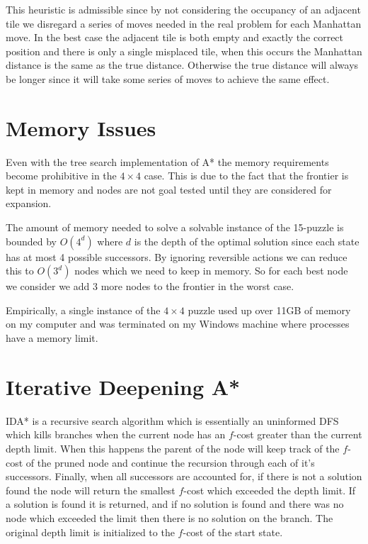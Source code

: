\documentclass[11pt, oneside]{article}   	%
\begin{document}
This heuristic is admissible since by not considering the occupancy of an adjacent tile we disregard a series of moves needed in the real problem for each Manhattan move.  In the best case the adjacent tile is both empty and exactly the correct position and there is only a single misplaced tile, when this occurs the Manhattan distance is the same as the true distance.  Otherwise the true distance will always be longer since it will take some series of moves to achieve the same effect.

\pagebreak{}

\section{Memory Issues}

Even with the tree search implementation of A* the memory requirements become prohibitive in the $4 \times 4$ case.  This is due to the fact that the frontier is kept in memory and nodes are not goal tested until they are considered for expansion.

The amount of memory needed to solve a solvable instance of the 15-puzzle is bounded by $O(4^d)$ where $d$ is the depth of the optimal solution since each state has at most 4 possible successors.  By ignoring reversible actions we can reduce this to $O(3^d)$ nodes which we need to keep in memory.  So for each best node we consider we add 3 more nodes to the frontier in the worst case.

Empirically, a single instance of the $4 \times 4$ puzzle used up over 11GB of memory on my computer and was terminated on my Windows machine where processes have a memory limit.

\pagebreak{}

\section{Iterative Deepening A*}

IDA* is a recursive search algorithm which is essentially an uninformed DFS which kills branches when the current node has an $f$-cost greater than the current depth limit.  When this happens the parent of the node will keep track of the $f$-cost of the pruned node and continue the recursion through each of it's successors.  Finally, when all successors are accounted for, if there is not a solution found the node will return the smallest $f$-cost which exceeded the depth limit.  If a solution is found it is returned, and if no solution is found and there was no node which exceeded the limit then there is no solution on the branch.  The original depth limit is initialized to the $f$-cost of the start state.
\end{document}
